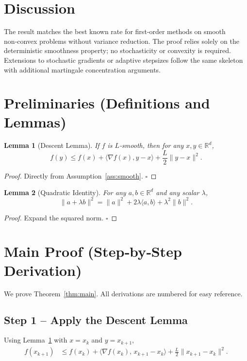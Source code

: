 \documentclass{article}
\newtheorem{lemma}{Lemma}[section]
\begin{document}
\section*{Discussion}
The result matches the best known rate for first‑order methods on smooth
non‑convex problems without variance reduction. The proof relies solely
on the deterministic smoothness property; no stochasticity or
convexity is required. Extensions to stochastic gradients or adaptive
stepsizes follow the same skeleton with additional martingale
concentration arguments.

\section*{Preliminaries (Definitions and Lemmas)}
\begin{lemma}[Descent Lemma]\label{lem:descent}
If $f$ is $L$‑smooth, then for any $x,y\in\mathbb{R}^{d}$,
\[
f(y)\le f(x)+\langle\nabla f(x),y-x\rangle+\frac{L}{2}\|y-x\|^{2}.
\tag{L.1}
\]
\end{lemma}
\begin{proof}
Directly from Assumption~\ref{ass:smooth}. \hfill $\square$
\end{proof}

\begin{lemma}[Quadratic Identity]\label{lem:quad}
For any $a,b\in\mathbb{R}^{d}$ and any scalar $\lambda$,
\[
\|a+\lambda b\|^{2}= \|a\|^{2}+2\lambda\langle a,b\rangle+\lambda^{2}\|b\|^{2}.
\tag{L.2}
\]
\end{lemma}
\begin{proof}
Expand the squared norm. \hfill $\square$
\end{proof}

\section*{Main Proof (Step‑by‑Step Derivation)}
We prove Theorem~\ref{thm:main}. All derivations are numbered for easy reference.

\subsection*{Step 1 – Apply the Descent Lemma}
Using Lemma~\ref{lem:descent} with $x=x_k$ and $y=x_{k+1}$,
\begin{align}
f(x_{k+1})
&\le f(x_k)+\bigl\langle\nabla f(x_k),\,x_{k+1}-x_k\bigr\rangle
   +\frac{L}{2}\|x_{k+1}-x_k\|^{2}. \tag{Step 1}
\end{align}
\end{document}
